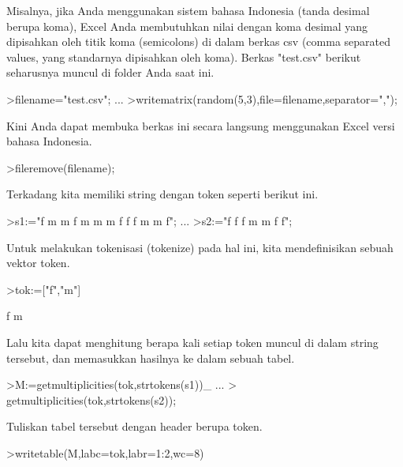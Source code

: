 \documentclass{article}
\newenvironment{eulernotebook}{\par}{\par}
\newenvironment{eulercomment}{\par\medskip}{\par\medskip}
\begin{document}
\begin{eulernotebook}
\begin{eulercomment}
\begin{eulercomment}
\begin{eulercomment}
\begin{eulercomment}
\begin{eulercomment}
\begin{eulercomment}
\begin{eulercomment}
Misalnya, jika Anda menggunakan sistem bahasa Indonesia (tanda desimal
berupa koma), Excel Anda membutuhkan nilai dengan koma desimal yang
dipisahkan oleh titik koma (semicolons) di dalam berkas csv (comma
separated values, yang standarnya dipisahkan oleh koma). Berkas
"test.csv" berikut seharusnya muncul di folder Anda saat ini.
\end{eulercomment}
\begin{eulerprompt}
>filename="test.csv"; ...
>writematrix(random(5,3),file=filename,separator=",");
\end{eulerprompt}
\begin{eulercomment}
Kini Anda dapat membuka berkas ini secara langsung menggunakan Excel
versi bahasa Indonesia.
\end{eulercomment}
\begin{eulerprompt}
>fileremove(filename);
\end{eulerprompt}
\begin{eulercomment}
Terkadang kita memiliki string dengan token seperti berikut ini.
\end{eulercomment}
\begin{eulerprompt}
>s1:="f m m f m m m f f f m m f";  ...
>s2:="f f f m m f f";
\end{eulerprompt}
\begin{eulercomment}
Untuk melakukan tokenisasi (tokenize) pada hal ini, kita
mendefinisikan sebuah vektor token.
\end{eulercomment}
\begin{eulerprompt}
>tok:=["f","m"]
\end{eulerprompt}
\begin{euleroutput}
  f
  m
\end{euleroutput}
\begin{eulercomment}
Lalu kita dapat menghitung berapa kali setiap token muncul di dalam
string tersebut, dan memasukkan hasilnya ke dalam sebuah tabel.
\end{eulercomment}
\begin{eulerprompt}
>M:=getmultiplicities(tok,strtokens(s1))_ ...
>  getmultiplicities(tok,strtokens(s2));
\end{eulerprompt}
\begin{eulercomment}
Tuliskan tabel tersebut dengan header berupa token.
\end{eulercomment}
\begin{eulerprompt}
>writetable(M,labc=tok,labr=1:2,wc=8)
\end{eulerprompt}
\begin{euleroutput}

\end{euleroutput}
\end{eulercomment}
\end{eulercomment}
\end{eulercomment}
\end{eulercomment}
\end{eulercomment}
\end{eulercomment}
\end{eulernotebook}
\end{document}
